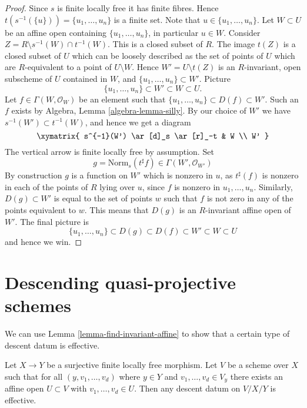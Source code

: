 \begin{proof}
Since $s$ is finite locally free it has finite fibres. Hence
$t(s^{-1}(\{u\})) = \{u_1, \ldots, u_n\}$ is a finite set.
Note that $u \in \{u_1, \ldots, u_n\}$.
Let $W \subset U$ be an affine open containing $\{u_1, \ldots, u_n\}$,
in particular $u \in W$. Consider
$Z = R \setminus s^{-1}(W) \cap t^{-1}(W)$. This is a closed subset
of $R$. The image $t(Z)$ is a closed subset of $U$ which can be loosely
described as the set of points of $U$ which are $R$-equivalent to a point
of $U \setminus W$. Hence $W' = U \setminus t(Z)$ is an $R$-invariant, open
subscheme of $U$ contained in $W$, and $\{u_1, \ldots, u_n\} \subset W'$.
Picture
$$
\{u_1, \ldots, u_n\} \subset W' \subset W \subset U.
$$
Let $f \in \Gamma(W, \mathcal{O}_W)$ be an element such that
$\{u_1, \ldots, u_n\} \subset D(f) \subset W'$. Such an $f$ exists by
Algebra, Lemma \ref{algebra-lemma-silly}. By our choice of $W'$ we
have $s^{-1}(W') \subset t^{-1}(W)$, and hence we get a diagram
$$
\xymatrix{
s^{-1}(W') \ar[d]_s \ar[r]_-t & W \\
W'
}
$$
The vertical arrow is finite locally free by assumption. Set
$$
g = \text{Norm}_s(t^\sharp f) \in \Gamma(W', \mathcal{O}_{W'})
$$
By construction $g$ is a function on $W'$ which is
nonzero in $u$, as $t^\sharp(f)$ is nonzero in each of the points of
$R$ lying over $u$, since $f$ is nonzero in $u_1, \ldots, u_n$.
Similarly, $D(g) \subset W'$ is equal to the
set of points $w$ such that $f$ is not zero in any of the points
equivalent to $w$. This means that $D(g)$ is an
$R$-invariant affine open of $W'$. The final picture is
$$
\{u_1, \ldots, u_n\} \subset D(g) \subset D(f) \subset W' \subset W \subset U
$$
and hence we win.
\end{proof}







\section{Descending quasi-projective schemes}
\label{section-quasi-projective}

\noindent
We can use Lemma \ref{lemma-find-invariant-affine}
to show that a certain type of descent datum is effective.

\begin{lemma}
\label{lemma-descend-along-finite}
Let $X \to Y$ be a surjective finite locally free morphism.
Let $V$ be a scheme over $X$ such that for all
$(y, v_1, \ldots, v_d)$ where $y \in Y$ and
$v_1, \ldots, v_d \in V_y$ there exists an affine open
$U \subset V$ with $v_1, \ldots, v_d \in U$.
Then any descent datum on $V/X/Y$ is effective.
\end{lemma}

